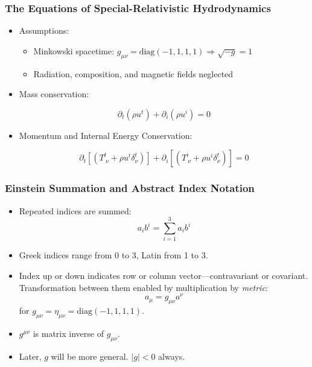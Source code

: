 \documentclass[]{beamer}
\newcommand{\paren}[1]{\left( #1 \right)}
\newcommand{\sqrbrace}[1]{\left[ #1 \right]}
\begin{document}
\begin{frame}
  \frametitle{The Equations of Special-Relativistic Hydrodynamics}
  \begin{itemize}
  \item Assumptions:
    \begin{itemize}
    \item Minkowski spacetime: $g_{\mu\nu} = \text{diag}(-1, 1, 1, 1) \Rightarrow \sqrt{-g} = 1$
    \item Radiation, composition, and magnetic fields neglected
    \end{itemize}
  \item Mass conservation:
    \begin{small}
      \begin{displaymath}
        \partial_t \paren{\rho u^t} + \partial_i\paren{\rho u^i} = 0
      \end{displaymath}
    \end{small}
  \item Momentum and Internal Energy Conservation:
    \begin{small}
      \begin{displaymath}
        \partial_t\sqrbrace{\paren{T^t_{\ \nu} + \rho u^t \delta^t_\nu}}
        + \partial_i\sqrbrace{\paren{T^i_{\ \nu} + \rho u^i \delta^t_\nu}}
        = 0
      \end{displaymath}
    \end{small}
  \end{itemize}
\end{frame}  

\begin{frame}
  \frametitle{Einstein Summation and Abstract Index Notation}
  \begin{itemize}
  \item Repeated indices are summed:
    $$a_i b^i = \sum_{i=1}^3 a_i b^i$$
  \item Greek indices range from 0 to 3, Latin from 1 to 3.
  \item Index up or down indicates row or column
    vector---contravariant or covariant. Transformation between them
    enabled by multiplication by \textit{metric}:
    $$a_\mu = g_{\mu \nu} a^\nu$$
    for $g_{\mu\nu} = \eta_{\mu\nu} = \text{diag}(-1, 1, 1, 1)$.
  \item $g^{\mu\nu}$ is matrix inverse of $g_{\mu\nu}$.
  \item Later, $g$ will be more general. $|g| < 0$ always.
  \end{itemize}
\end{frame}
\end{document}
